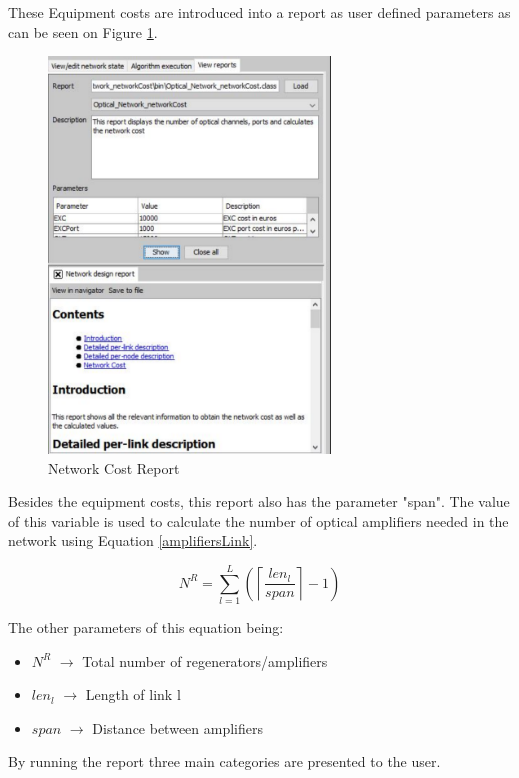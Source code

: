 	These Equipment costs are introduced into a report as user defined parameters as can be seen on Figure \ref{networkCost_Report}.
	
	\begin{figure}[h!]
		\centering
		\includegraphics[width=7.5cm]{networkCost_Report.pdf}
		\caption{Network Cost Report}
		\label{networkCost_Report}
	\end{figure}	
	
	Besides the equipment costs, this report also has the parameter "span". The value of this variable is used to calculate the number of optical amplifiers needed in the network using Equation \ref{amplifiersLink}.
	
	\begin{equation}
		N^R = \sum\limits_{l=1}^L\left(\left\lceil\frac{len_l}{span}\right\rceil-1\right)
		\label{amplifiersLink}
	\end{equation}

	The other parameters of this equation being:
	
	\begin{itemize}
		\item{$N^R$			$\rightarrow$ Total number of regenerators/amplifiers}
		\item{$len_l$		$\rightarrow$ Length of link l}
		\item{$span$		$\rightarrow$ Distance between amplifiers}	
	\end{itemize}	
	
	By running the report three main categories are presented to the user.
	
